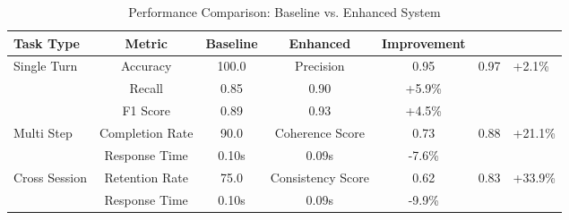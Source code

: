 \begin{table}[h]
\centering
\caption{Performance Comparison: Baseline vs. Enhanced System}
\label{tab:performance}
\begin{tabular}{lcccc}
\hline
Task Type & Metric & Baseline & Enhanced & Improvement \\
\hline
Single Turn & Accuracy & 100.0%
 & Precision & 0.95 & 0.97 & +2.1\% \\
 & Recall & 0.85 & 0.90 & +5.9\% \\
 & F1 Score & 0.89 & 0.93 & +4.5\% \\
\hline
Multi Step & Completion Rate & 90.0%
 & Coherence Score & 0.73 & 0.88 & +21.1\% \\
 & Response Time & 0.10s & 0.09s & -7.6\% \\
\hline
Cross Session & Retention Rate & 75.0%
 & Consistency Score & 0.62 & 0.83 & +33.9\% \\
 & Response Time & 0.10s & 0.09s & -9.9\% \\
\hline
\end{tabular}
\end{table}
